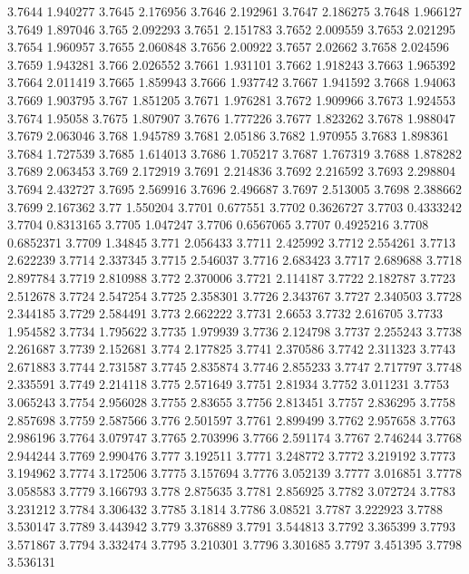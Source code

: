 3.7644  1.940277
3.7645  2.176956
3.7646  2.192961
3.7647  2.186275
3.7648  1.966127
3.7649  1.897046
3.765  2.092293
3.7651  2.151783
3.7652  2.009559
3.7653  2.021295
3.7654  1.960957
3.7655  2.060848
3.7656  2.00922
3.7657  2.02662
3.7658  2.024596
3.7659  1.943281
3.766  2.026552
3.7661  1.931101
3.7662  1.918243
3.7663  1.965392
3.7664  2.011419
3.7665  1.859943
3.7666  1.937742
3.7667  1.941592
3.7668  1.94063
3.7669  1.903795
3.767  1.851205
3.7671  1.976281
3.7672  1.909966
3.7673  1.924553
3.7674  1.95058
3.7675  1.807907
3.7676  1.777226
3.7677  1.823262
3.7678  1.988047
3.7679  2.063046
3.768  1.945789
3.7681  2.05186
3.7682  1.970955
3.7683  1.898361
3.7684  1.727539
3.7685  1.614013
3.7686  1.705217
3.7687  1.767319
3.7688  1.878282
3.7689  2.063453
3.769  2.172919
3.7691  2.214836
3.7692  2.216592
3.7693  2.298804
3.7694  2.432727
3.7695  2.569916
3.7696  2.496687
3.7697  2.513005
3.7698  2.388662
3.7699  2.167362
3.77  1.550204
3.7701  0.677551
3.7702  0.3626727
3.7703  0.4333242
3.7704  0.8313165
3.7705  1.047247
3.7706  0.6567065
3.7707  0.4925216
3.7708  0.6852371
3.7709  1.34845
3.771  2.056433
3.7711  2.425992
3.7712  2.554261
3.7713  2.622239
3.7714  2.337345
3.7715  2.546037
3.7716  2.683423
3.7717  2.689688
3.7718  2.897784
3.7719  2.810988
3.772  2.370006
3.7721  2.114187
3.7722  2.182787
3.7723  2.512678
3.7724  2.547254
3.7725  2.358301
3.7726  2.343767
3.7727  2.340503
3.7728  2.344185
3.7729  2.584491
3.773  2.662222
3.7731  2.6653
3.7732  2.616705
3.7733  1.954582
3.7734  1.795622
3.7735  1.979939
3.7736  2.124798
3.7737  2.255243
3.7738  2.261687
3.7739  2.152681
3.774  2.177825
3.7741  2.370586
3.7742  2.311323
3.7743  2.671883
3.7744  2.731587
3.7745  2.835874
3.7746  2.855233
3.7747  2.717797
3.7748  2.335591
3.7749  2.214118
3.775  2.571649
3.7751  2.81934
3.7752  3.011231
3.7753  3.065243
3.7754  2.956028
3.7755  2.83655
3.7756  2.813451
3.7757  2.836295
3.7758  2.857698
3.7759  2.587566
3.776  2.501597
3.7761  2.899499
3.7762  2.957658
3.7763  2.986196
3.7764  3.079747
3.7765  2.703996
3.7766  2.591174
3.7767  2.746244
3.7768  2.944244
3.7769  2.990476
3.777  3.192511
3.7771  3.248772
3.7772  3.219192
3.7773  3.194962
3.7774  3.172506
3.7775  3.157694
3.7776  3.052139
3.7777  3.016851
3.7778  3.058583
3.7779  3.166793
3.778  2.875635
3.7781  2.856925
3.7782  3.072724
3.7783  3.231212
3.7784  3.306432
3.7785  3.1814
3.7786  3.08521
3.7787  3.222923
3.7788  3.530147
3.7789  3.443942
3.779  3.376889
3.7791  3.544813
3.7792  3.365399
3.7793  3.571867
3.7794  3.332474
3.7795  3.210301
3.7796  3.301685
3.7797  3.451395
3.7798  3.536131
